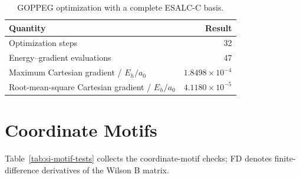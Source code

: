 \documentclass[10pt]{article}
\begin{document}
{\begin{table}[htbp]
\centering
\caption{GOPPEG optimization with a complete ESALC-C basis.}
\label{tab:goppeg-sycart}
\begin{tabular}{lr}
\toprule
Quantity & Result \\
\midrule
Optimization steps & 32 \\
Energy--gradient evaluations & 47 \\
Maximum Cartesian gradient / \(E_h/a_0\) & \(1.8498\times10^{-4}\) \\
Root-mean-square Cartesian gradient / \(E_h/a_0\) & \(4.1180\times10^{-5}\) \\
\bottomrule
\end{tabular}
\end{table}

\section{Coordinate Motifs}

{Table~\ref{tab:si-motif-tests} collects the coordinate-motif
checks; FD denotes finite-difference derivatives of the Wilson B matrix.}

}
\end{document}
